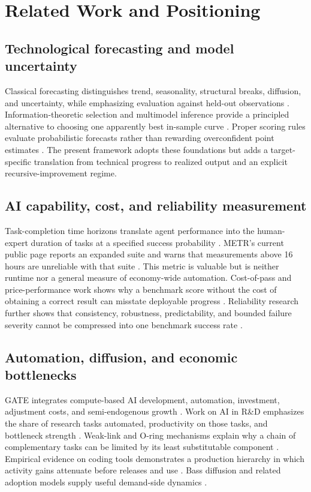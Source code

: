 
\section{Related Work and Positioning}

\subsection{Technological forecasting and model uncertainty}

Classical forecasting distinguishes trend, seasonality, structural breaks, diffusion, and uncertainty, while emphasizing evaluation against held-out observations \citep{hyndman2021,hamilton1989,diebold1995}. Information-theoretic selection and multimodel inference provide a principled alternative to choosing one apparently best in-sample curve \citep{akaike1974,burnham2002}. Proper scoring rules evaluate probabilistic forecasts rather than rewarding overconfident point estimates \citep{gneiting2007}. The present framework adopts these foundations but adds a target-specific translation from technical progress to realized output and an explicit recursive-improvement regime.

\subsection{AI capability, cost, and reliability measurement}

Task-completion time horizons translate agent performance into the human-expert duration of tasks at a specified success probability \citep{kwa2025}. METR's current public page reports an expanded suite and warns that measurements above 16 hours are unreliable with that suite \citep{metr2026}. This metric is valuable but is neither runtime nor a general measure of economy-wide automation. Cost-of-pass and price-performance work shows why a benchmark score without the cost of obtaining a correct result can misstate deployable progress \citep{erol2025,gundlach2025}. Reliability research further shows that consistency, robustness, predictability, and bounded failure severity cannot be compressed into one benchmark success rate \citep{rabanser2026}.

\subsection{Automation, diffusion, and economic bottlenecks}

GATE integrates compute-based AI development, automation, investment, adjustment costs, and semi-endogenous growth \citep{erdil2025gate}. Work on AI in R\&D emphasizes the share of research tasks automated, productivity on those tasks, and bottleneck strength \citep{jones2025rnd}. Weak-link and O-ring mechanisms explain why a chain of complementary tasks can be limited by its least substitutable component \citep{kremer1993,jones2026future}. Empirical evidence on coding tools demonstrates a production hierarchy in which activity gains attenuate before releases and use \citep{demirer2026}. Bass diffusion and related adoption models supply useful demand-side dynamics \citep{bass1969}.

